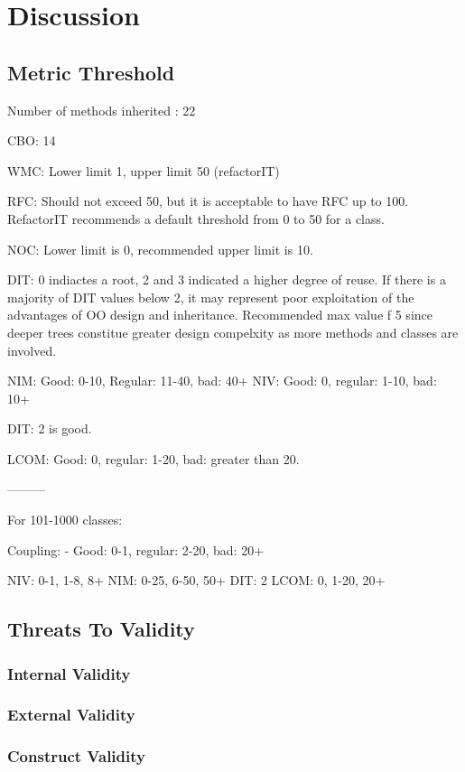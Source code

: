 
\chapter{Discussion}

\section{Metric Threshold}
Number of methods inherited : 22

CBO: 14

WMC: Lower limit 1, upper limit 50 (refactorIT)

RFC: Should not exceed 50, but it is acceptable to have RFC up to 100. RefactorIT recommends a default threshold from 0 to 50 for a class. 

NOC: Lower limit is 0, recommended upper limit is 10.

DIT: 0 indiactes a root, 2 and 3 indicated a higher degree of reuse. If there is a majority of DIT values 
below 2, it may represent poor exploitation of the advantages of OO design and inheritance. Recommended max value f 5 since deeper trees constitue greater design compelxity as more methods and classes are involved. 

NIM: Good: 0-10, Regular: 11-40, bad: 40+
NIV: Good: 0, regular: 1-10, bad: 10+

DIT: 2 is good. 

LCOM: Good: 0, regular: 1-20, bad: greater than 20. 

---------

For 101-1000 classes:

Coupling: 
- Good: 0-1, regular: 2-20, bad: 20+

NIV: 0-1, 1-8, 8+
NIM: 0-25, 6-50, 50+
DIT: 2
LCOM: 0, 1-20, 20+

\section{Threats To Validity}
\label{sub:threats_to_validity}

\subsection{Internal Validity}
\label{sub:internal_validty}

\subsection{External Validity}
\label{sub:external_validity}

\subsection{Construct Validity} %
\label{sub:construct_validity}

